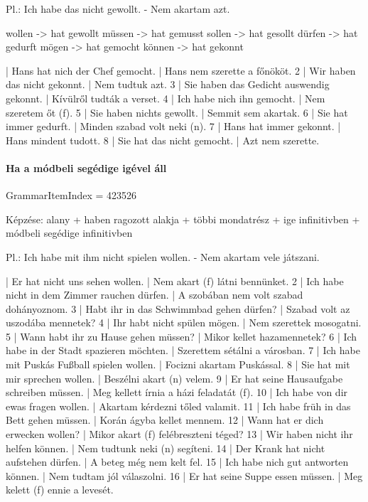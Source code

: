 \documentclass{article}
\newenvironment{desc}{\verbatim}{\endverbatim}
\newenvironment{exmp}{\verbatim}{\endverbatim}
\begin{document}
\begin{desc}
Pl.: Ich habe das nicht gewollt. - Nem akartam azt.

wollen -> hat gewollt
müssen -> hat gemusst
sollen -> hat gesollt
dürfen -> hat gedurft
mögen -> hat gemocht
können -> hat gekonnt
\end{desc}

\begin{exmp}
1 | Hans hat nich der Chef gemocht. | Hans nem szerette a főnököt.
2 | Wir haben das nicht gekonnt. | Nem tudtuk azt.
3 | Sie haben das Gedicht auswendig gekonnt. | Kívülről tudták a verset.
4 | Ich habe nich ihn gemocht. | Nem szeretem őt (f).
5 | Sie haben nichts gewollt. | Semmit sem akartak.
6 | Sie hat immer gedurft. | Minden szabad volt neki (n).
7 | Hans hat immer gekonnt. | Hans mindent tudott.
8 | Sie hat das nicht gemocht. | Azt nem szerette.
\end{exmp}

\paragraph{Ha a módbeli segédige igével áll}

GrammarItemIndex = 423526

\begin{desc}
Képzése:
alany + haben ragozott alakja + többi mondatrész + ige infinitivben + módbeli segédige infinitivben

Pl.: Ich habe mit ihm nicht spielen wollen. - Nem akartam vele játszani.
\end{desc}

\begin{exmp}
1 | Er hat nicht uns sehen wollen. | Nem akart (f) látni bennünket.
2 | Ich habe nicht in dem Zimmer rauchen dürfen. | A szobában nem volt szabad dohányoznom.
3 | Habt ihr in das Schwimmbad gehen dürfen? | Szabad volt az uszodába mennetek?
4 | Ihr habt nicht spülen mögen. | Nem szerettek mosogatni.
5 | Wann habt ihr zu Hause gehen müssen? | Mikor kellet hazamennetek?
6 | Ich habe in der Stadt spazieren möchten. | Szerettem sétálni a városban.
7 | Ich habe mit Puskás Fußball spielen wollen. | Focizni akartam Puskással.
8 | Sie hat mit mir sprechen wollen. | Beszélni akart (n) velem.
9 | Er hat seine Hausaufgabe schreiben müssen. | Meg kellett írnia a házi feladatát (f).
10 | Ich habe von dir ewas fragen wollen. | Akartam kérdezni tőled valamit.
11 | Ich habe früh in das Bett gehen müssen. | Korán ágyba kellet mennem.
12 | Wann hat er dich erwecken wollen? | Mikor akart (f) felébreszteni téged?
13 | Wir haben nicht ihr helfen können. | Nem tudtunk neki (n) segíteni.
14 | Der Krank hat nicht aufstehen dürfen. | A beteg még nem kelt fel.
15 | Ich habe nich gut antworten können. | Nem tudtam jól válaszolni.
16 | Er hat seine Suppe essen müssen. | Meg kelett (f) ennie a levesét.
\end{exmp}
\end{document}
